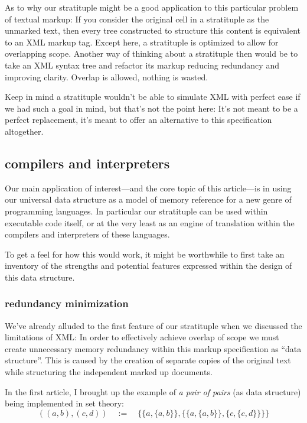 \documentclass[twoside]{article}
\begin{document}
As to why our stratituple might be a good application to this particular problem of textual markup: If you
consider the original cell in a stratituple as the unmarked text, then every tree constructed to structure this
content is equivalent to an XML markup tag. Except here, a stratituple is optimized to allow for overlapping
scope. Another way of thinking about a stratituple then would be to take an XML syntax tree and refactor its
markup reducing redundancy and improving clarity. Overlap is allowed, nothing is wasted.

Keep in mind a stratituple wouldn't be able to simulate XML with perfect ease if we had such a goal in mind,
but that's not the point here: It's not meant to be a perfect replacement, it's meant to offer an alternative
to this specification altogether.

\subsection*{compilers and interpreters}

Our main application of interest---and the core topic of this article---is in using our universal data structure
as a model of memory reference for a new genre of programming languages. In particular our stratituple can be used
within executable code itself, or at the very least as an engine of translation within the compilers and interpreters
of these languages.

To get a feel for how this would work, it might be worthwhile to first take an inventory of
the strengths and potential features expressed within the design of this data structure.

\subsubsection*{redundancy minimization}

We've already alluded to the first feature of our stratituple when we discussed the limitations of XML:
In order to effectively achieve overlap of scope we must create unnecessary memory redundancy within
this markup specification as ``data structure''. This is caused by the creation of separate copies
of the original text while structuring the independent marked up documents.

In the first article, I brought up the example of \emph{a pair of pairs} (as data structure) being implemented in set theory:
$$ ((a,b),(c,d))\quad:=\quad\{\{a,\{a,b\}\},\{\{a,\{a,b\}\},\{c,\{c,d\}\}\}\} $$
\end{document}
